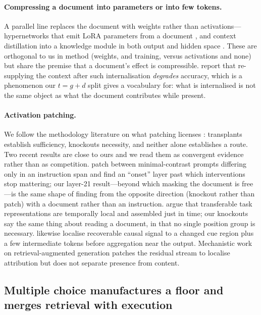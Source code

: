 \documentclass{article}
\newcommand{\dvec}{\ensuremath{d}}
\newcommand{\gvec}{\ensuremath{g}}
\newcommand{\tvec}{\ensuremath{t}}
\begin{document}
\paragraph{Compressing a document into parameters or into few tokens.} A
parallel line replaces the document with weights rather than activations---
hypernetworks that emit LoRA parameters from a document
\citep{doc2lora2026}, and context distillation into a knowledge module in both
output and hidden space \citep{deepcontextdistill2025}. These are orthogonal to
us in method (weights, and training, versus activations and none) but share the
premise that a document's effect is compressible.
\citet{contextreturns2026} report that re-supplying the context after such
internalisation \emph{degrades} accuracy, which is a phenomenon our
$\tvec=\gvec+\dvec$ split gives a vocabulary for: what is internalised is not
the same object as what the document contributes while present.

\paragraph{Activation patching.}
We follow the methodology literature on what patching licenses
\citep{zhang2023bestpractices, heimersheim2024patching}: transplants establish
sufficiency, knockouts necessity, and neither alone establishes a route. Two
recent results are close to ours and we read them as convergent evidence rather
than as competition. \citet{onset2025instruction} patch between minimal-contrast
prompts differing only in an instruction span and find an ``onset'' layer past
which interventions stop mattering; our layer-21 result---beyond which masking
the document is free---is the same shape of finding from the opposite direction
(knockout rather than patch) with a document rather than an instruction.
\citet{jit2025taskrepr} argue that transferable task representations are
temporally local and assembled just in time; our knockouts say the same thing
about reading a document, in that no single position group is necessary.
\citet{semanticconflicts2026} likewise localise recoverable causal signal to a
changed cue region plus a few intermediate tokens before aggregation near the
output. Mechanistic work on retrieval-augmented generation
\citep{ragcite2026} patches the residual stream to localise attribution but
does not separate presence from content.


\subsection{Multiple choice manufactures a floor and merges retrieval with
execution}
\label{sec:format}
\end{document}
